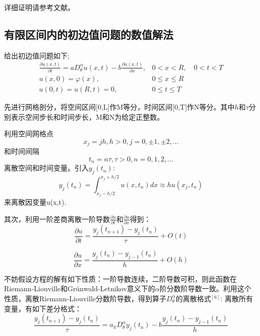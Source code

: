 详细证明请参考文献\cite{lqx2007}。



\subsection{有限区间内的初边值问题的数值解法}
给出初边值问题如下;
\begin{equation} 
\begin{array}{ll}{\frac{\partial u(x, t)}{\partial t}=a D_{\theta}^{\alpha} u(x, t)-b \frac{\partial u(x, t)}{\partial x},} & {0<x<R, \quad 0<t<T} \\ {u(x, 0)=\varphi(x),} & {0 \leq x \leq R} \\ {u(0, t)=u(R, t)=0,} & {0 \leq t \leq T}\end{array}
\end{equation}

先进行网格剖分，将空间区间[0,L]作M等分，时间区间[0,T]作N等分。其中$h$和$\tau$分别表示空间步长和时间步长，M和N为给定正整数。

利用空间网格点
$$x_{j}=jh,h>0,j=0,\pm1,\pm2,...$$
和时间间隔
$$t_{n}=n\tau,\tau>0,n=0,1,2,...$$
离散空间和时间变量。引入$y_{j}(t_{n})$:
$$y_{j}\left(t_{n}\right)=\int_{x_{j}-h / 2}^{x_{j}+h / 2} u\left(x, t_{n}\right) d x \approx h u\left(x_{j}, t_{n}\right)$$
来离散因变量u(x,t).

其次，利用一阶差商离散一阶导数$\frac{\partial u}{\partial t}$和$\frac{\partial u}{\partial x}$得到：
\begin{equation}
\frac{\partial u}{\partial t}=\frac{y_{j}\left(t_{n+1}\right)-y_{j}\left(t_{n}\right)}{\tau}+O(t)
\end{equation}


\begin{equation}
\frac{\partial u}{\partial x}=\frac{y_{j}\left(t_{n}\right)-y_{j-1}\left(t_{n}\right)}{h}+O(h)
\end{equation}





不妨假设方程的解有如下性质：一阶导数连续，二阶导数可积，则此函数在Riemann-Liouville和Grünwald-Letnikov意义下的$\alpha$阶分数阶导数一致。利用这个性质，离散Riemann-Liouville分数阶导数，得到算子$D_{\theta}^{\alpha}$的离散格式$^{[6]}$:
离散所有变量，有如下差分格式：
\begin{equation}
\frac{y_{j}\left(t_{n+1}\right)-y_{j}\left(t_{n}\right)}{\tau}=a_{h} D_{\theta}^{\alpha} y_{j}\left(t_{n}\right)-b \frac{y_{j}\left(t_{n}\right)-y_{j-1}\left(t_{n}\right)}{h}
\end{equation}

